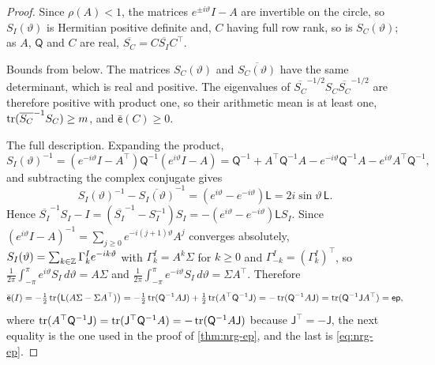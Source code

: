 \begin{proof}
Since $\rho(A)<1$, the matrices $e^{\pm i\vartheta}I-A$ are invertible on the circle, so $S_I(\vartheta)$ is Hermitian positive definite and, $C$ having full row rank, so is $S_C(\vartheta)$; as $A$, $\mathsf Q$ and $C$ are real, $\overline{S_C}=C\overline{S_I}C^\top$.

Bounds from below. The matrices $S_C(\vartheta)$ and $\overline{S_C(\vartheta)}$ have the same determinant, which is real and positive. The eigenvalues of $\overline{S_C}^{-1/2}S_C\overline{S_C}^{-1/2}$ are therefore positive with product one, so their arithmetic mean is at least one, $\operatorname{tr}(\overline{S_C}^{-1}S_C)\ge m$, and $\bar{\mathsf e}(C)\ge0$.

The full description. Expanding the product,
\[ S_I(\vartheta)^{-1}=(e^{-i\vartheta}I-A^\top)\mathsf Q^{-1}(e^{i\vartheta}I-A)=\mathsf Q^{-1}+A^\top\mathsf Q^{-1}A-e^{-i\vartheta}\mathsf Q^{-1}A-e^{i\vartheta}A^\top\mathsf Q^{-1}, \]
and subtracting the complex conjugate gives
\[ S_I(\vartheta)^{-1}-\overline{S_I(\vartheta)}^{-1}=(e^{i\vartheta}-e^{-i\vartheta})\mathsf L=2i\sin\vartheta\,\mathsf L. \]
Hence $\overline{S_I}^{-1}S_I-I=(\overline{S_I}^{-1}-S_I^{-1})S_I=-(e^{i\vartheta}-e^{-i\vartheta})\mathsf LS_I$. Since $(e^{i\vartheta}I-A)^{-1}=\sum_{j\ge0}e^{-i(j+1)\vartheta}A^j$ converges absolutely, $S_I(\vartheta)=\sum_{k\in\mathbb{Z}}\Gamma^I_ke^{-ik\vartheta}$ with $\Gamma^I_k=A^k\Sigma$ for $k\ge0$ and $\Gamma^I_{-k}=(\Gamma^I_k)^\top$, so $\frac1{2\pi}\int_{-\pi}^{\pi}e^{i\vartheta}S_I\,d\vartheta=A\Sigma$ and $\frac1{2\pi}\int_{-\pi}^{\pi}e^{-i\vartheta}S_I\,d\vartheta=\Sigma A^\top$. Therefore
\[ \bar{\mathsf e}(I)=-\tfrac12\operatorname{tr}\bigl(\mathsf L(A\Sigma-\Sigma A^\top)\bigr)=-\tfrac12\operatorname{tr}(\mathsf Q^{-1}A\mathsf J)+\tfrac12\operatorname{tr}(A^\top\mathsf Q^{-1}\mathsf J)=-\operatorname{tr}(\mathsf Q^{-1}A\mathsf J)=\operatorname{tr}(\mathsf Q^{-1}\mathsf JA^\top)=\mathsf{ep}, \]
where $\operatorname{tr}(A^\top\mathsf Q^{-1}\mathsf J)=\operatorname{tr}(\mathsf J^\top\mathsf Q^{-1}A)=-\operatorname{tr}(\mathsf Q^{-1}A\mathsf J)$ because $\mathsf J^\top=-\mathsf J$, the next equality is the one used in the proof of \cref{thm:nrg-ep}, and the last is \cref{eq:nrg-ep}.


\end{proof}
